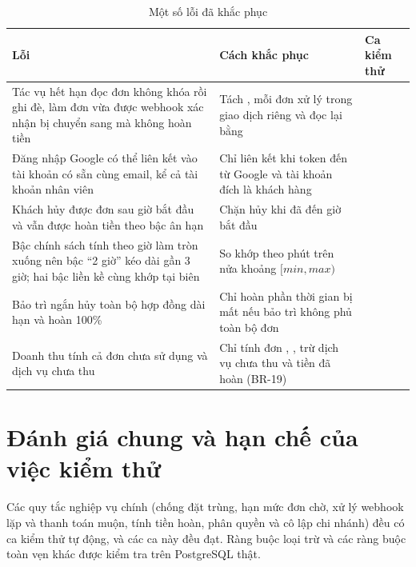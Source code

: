 \begin{table}[!htbp]
\centering
\caption{Một số lỗi đã khắc phục}
\label{tab:defects-summary}
\footnotesize
\renewcommand{\arraystretch}{1.15}
\begin{tabularx}{\linewidth}{|L|L|P{4.2cm}|}
\hline
\textbf{Lỗi} & \textbf{Cách khắc phục} & \textbf{Ca kiểm thử} \\
\hline
Tác vụ hết hạn đọc đơn không khóa rồi ghi đè, làm đơn vừa được webhook xác nhận bị chuyển sang  mà không hoàn tiền & Tách , mỗi đơn xử lý trong giao dịch riêng và đọc lại bằng  &  \\
\hline
Đăng nhập Google có thể liên kết vào tài khoản có sẵn cùng email, kể cả tài khoản nhân viên & Chỉ liên kết khi token đến từ Google và tài khoản đích là khách hàng &  \\
\hline
Khách hủy được đơn sau giờ bắt đầu và vẫn được hoàn tiền theo bậc ân hạn & Chặn hủy khi đã đến giờ bắt đầu &  \\
\hline
Bậc chính sách tính theo giờ làm tròn xuống nên bậc ``2 giờ'' kéo dài gần 3 giờ; hai bậc liền kề cùng khớp tại biên & So khớp theo phút trên nửa khoảng $[min, max)$ &  \\
\hline
Bảo trì ngắn hủy toàn bộ hợp đồng dài hạn và hoàn 100\% & Chỉ hoàn phần thời gian bị mất nếu bảo trì không phủ toàn bộ đơn &  \\
\hline
Doanh thu tính cả đơn chưa sử dụng và dịch vụ chưa thu & Chỉ tính đơn , , trừ dịch vụ chưa thu và tiền đã hoàn (BR-19) &  \\
\hline
\end{tabularx}
\end{table}

\section{Đánh giá chung và hạn chế của việc kiểm thử}
\label{sec:kt-danh-gia-chung}

Các quy tắc nghiệp vụ chính (chống đặt trùng, hạn mức đơn chờ, xử lý webhook lặp và thanh toán muộn, tính tiền hoàn, phân quyền và cô lập chi nhánh) đều có ca kiểm thử tự động, và các ca này đều đạt. Ràng buộc loại trừ và các ràng buộc toàn vẹn khác được kiểm tra trên PostgreSQL thật.

